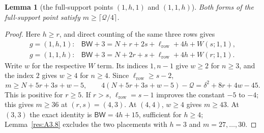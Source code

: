 \documentclass[11pt]{article}
\newtheorem{lemma}[theorem]{Lemma}
\theoremstyle{definition}
\theoremstyle{remark}
\theoremstyle{plain}
\begin{document}
\begin{lemma}[the full-support points $(1,h,1)$ and $(1,1,h)$]\label{res:A3.7}
Both forms of the full-support point satisfy $m\ge\lceil \mathcal Q/4\rceil$.
\end{lemma}
\begin{proof}
Here $h\ge r$, and direct counting of the same three rows gives
\[
\begin{array}{ll}
g=(1,h,1):&\mathsf{BW}+3=N+r+2s+\ell_{\mathrm{row}}+4h+W(s;1,1),\\
g=(1,1,h):&\mathsf{BW}+3=N+2r+s+\ell_{\mathrm{row}}+4h+W(r;1,1).
\end{array}\tag{3.22}\label{eq:capacity-22}
\]
Write $w$ for the respective $W$ term.  Its indices $1,n-1$ give
$w\ge2$ for $n\ge3$, and the index $2$ gives $w\ge4$ for $n\ge4$.
Since $\ell_{\mathrm{row}}\ge s-2$,
\[
 m\ge N+5r+3s+w-5,\qquad
 4(N+5r+3s+w-5)-\mathcal Q=\delta^2+8r+4w-45.
\]
This is positive for $r\ge5$.  If $r>s$, $\ell_{\mathrm{row}}=s-1$ improves the
constant $-5$ to $-4$; this gives $m\ge36$ at $(r,s)=(4,3)$.
At $(4,4)$, $w\ge4$ gives $m\ge43$.
At $(3,3)$ the exact identity is $\mathsf{BW}=4h+15$, sufficient for
$h\ge4$; Lemma~\ref{res:A3.8} excludes the two placements with $h=3$ and $m=27,\ldots,30$.
\end{proof}
\end{document}
